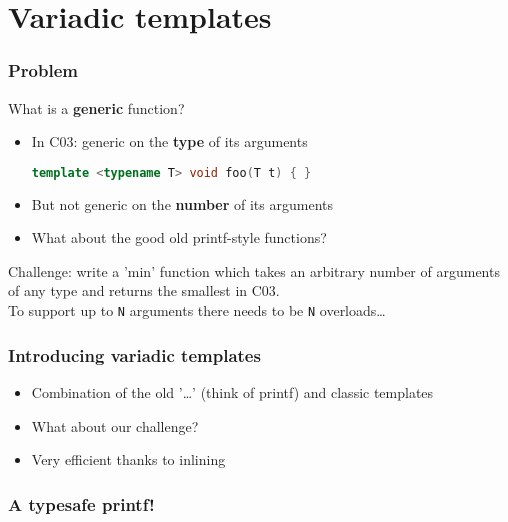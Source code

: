 \documentclass[xcolor=dvipsnames]{beamer}
\newcommand{\CC}{C\nolinebreak\hspace{-.05em}\raisebox{.4ex}{\scriptsize\bf +}\nolinebreak\hspace{-.05em}\raisebox{.4ex}{\scriptsize\bf +}}
\begin{document}
\section{Variadic templates}
\begin{frame}[fragile]
  \frametitle{Problem}
  What is a \textbf{generic} function?
  \pause
  \begin{itemize}
    \item In \CC{}03: generic on the \textbf{type} of its arguments\\
      \begin{lstlisting}[language=cpp]
        template <typename T> void foo(T t) { }
      \end{lstlisting}
    \pause
    \item But not generic on the \textbf{number} of its arguments
    \pause
    \item What about the good old printf-style functions?
  \end{itemize}
  \pause
  Challenge: write a 'min' function which takes an arbitrary number of arguments
  of any type and returns the smallest in \CC{}03.\\
  \pause
  \vspace{0.5cm}
  To support up to \verb#N# arguments there needs to be \verb#N# overloads\ldots
\end{frame}

\begin{frame}[fragile]
  \frametitle{Introducing variadic templates}
  \begin{itemize}
    \item Combination of the old '\ldots' (think of printf) and classic templates
    \pause
    \item What about our challenge?
    \pause
  \end{itemize}

  

  \begin{itemize}
    \item Very efficient thanks to inlining
  \end{itemize}
\end{frame}

\begin{frame}[fragile]
    
  \frametitle{A typesafe printf!}

  
\end{frame}
\end{document}
